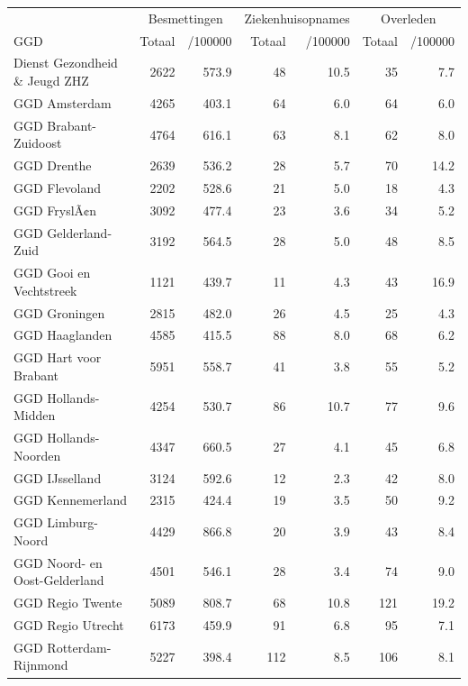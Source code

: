 \documentclass[
  english,
  man,floatsintext]{apa6}
\begin{document}
\begin{table}[H]
\centering\begingroup\fontsize{10}{12}\selectfont

\begin{threeparttable}
\begin{tabular}{lrrrrrr}
\toprule
\multicolumn{1}{c}{ } & \multicolumn{2}{c}{Besmettingen} & \multicolumn{2}{c}{Ziekenhuisopnames} & \multicolumn{2}{c}{Overleden} \\
\cmidrule(l{3pt}r{3pt}){2-3} \cmidrule(l{3pt}r{3pt}){4-5} \cmidrule(l{3pt}r{3pt}){6-7}
GGD & Totaal & /100000 & Totaal & /100000 & Totaal & /100000\\
\midrule
Dienst Gezondheid \& Jeugd ZHZ & 2622 & 573.9 & 48 & 10.5 & 35 & 7.7\\
GGD Amsterdam & 4265 & 403.1 & 64 & 6.0 & 64 & 6.0\\
GGD Brabant-Zuidoost & 4764 & 616.1 & 63 & 8.1 & 62 & 8.0\\
GGD Drenthe & 2639 & 536.2 & 28 & 5.7 & 70 & 14.2\\
GGD Flevoland & 2202 & 528.6 & 21 & 5.0 & 18 & 4.3\\
GGD FryslÃ¢n & 3092 & 477.4 & 23 & 3.6 & 34 & 5.2\\
GGD Gelderland-Zuid & 3192 & 564.5 & 28 & 5.0 & 48 & 8.5\\
GGD Gooi en Vechtstreek & 1121 & 439.7 & 11 & 4.3 & 43 & 16.9\\
GGD Groningen & 2815 & 482.0 & 26 & 4.5 & 25 & 4.3\\
GGD Haaglanden & 4585 & 415.5 & 88 & 8.0 & 68 & 6.2\\
GGD Hart voor Brabant & 5951 & 558.7 & 41 & 3.8 & 55 & 5.2\\
GGD Hollands-Midden & 4254 & 530.7 & 86 & 10.7 & 77 & 9.6\\
GGD Hollands-Noorden & 4347 & 660.5 & 27 & 4.1 & 45 & 6.8\\
GGD IJsselland & 3124 & 592.6 & 12 & 2.3 & 42 & 8.0\\
GGD Kennemerland & 2315 & 424.4 & 19 & 3.5 & 50 & 9.2\\
GGD Limburg-Noord & 4429 & 866.8 & 20 & 3.9 & 43 & 8.4\\
GGD Noord- en Oost-Gelderland & 4501 & 546.1 & 28 & 3.4 & 74 & 9.0\\
GGD Regio Twente & 5089 & 808.7 & 68 & 10.8 & 121 & 19.2\\
GGD Regio Utrecht & 6173 & 459.9 & 91 & 6.8 & 95 & 7.1\\
GGD Rotterdam-Rijnmond & 5227 & 398.4 & 112 & 8.5 & 106 & 8.1\\

\end{tabular}
\end{threeparttable}
\end{table}
\end{document}
